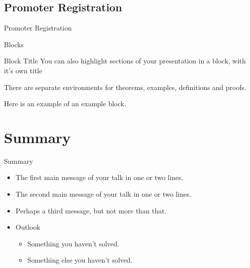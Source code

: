 \documentclass{beamer}
\begin{document}
\subsection{Promoter Registration}
\begin{frame}{Promoter Registration}

\end{frame}

\begin{frame}{Blocks}
\begin{block}{Block Title}
You can also highlight sections of your presentation in a block, with it's own title
\end{block}
\begin{theorem}
There are separate environments for theorems, examples, definitions and proofs.
\end{theorem}
\begin{example}
Here is an example of an example block.
\end{example}
\end{frame}

\section*{Summary}

\begin{frame}{Summary}
  \begin{itemize}
  \item
    The \alert{first main message} of your talk in one or two lines.
  \item
    The \alert{second main message} of your talk in one or two lines.
  \item
    Perhaps a \alert{third message}, but not more than that.
  \end{itemize}
  
  \begin{itemize}
  \item
    Outlook
    \begin{itemize}
    \item
      Something you haven't solved.
    \item
      Something else you haven't solved.
    \end{itemize}
  \end{itemize}
\end{frame}
\end{document}
